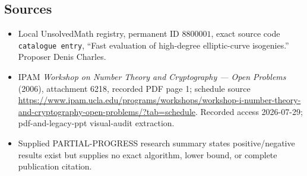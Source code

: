 \documentclass[11pt]{article}
\begin{document}
\subsection{Sources}
\begin{itemize}
\item Local UnsolvedMath registry, permanent ID \(8800001\), exact source code \texttt{catalogue entry}, ``Fast evaluation of high-degree elliptic-curve isogenies.'' Proposer Denis Charles.
\item IPAM \emph{Workshop on Number Theory and Cryptography --- Open Problems} (2006), attachment 6218, recorded PDF page 1; schedule source \url{https://www.ipam.ucla.edu/programs/workshops/workshop-i-number-theory-and-cryptography-open-problems/?tab=schedule}. Recorded access 2026-07-29; pdf-and-legacy-ppt visual-audit extraction.
\item Supplied PARTIAL-PROGRESS research summary states positive/negative results exist but supplies no exact algorithm, lower bound, or complete publication citation.
\end{itemize}
\end{document}
